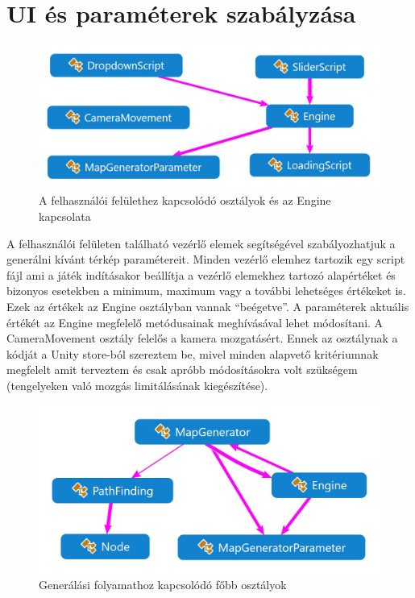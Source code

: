 \newpage
\section{UI és paraméterek szabályzása}

\begin{figure}[h!]
\centering
\includegraphics[scale=0.37]{kepek/White_UI.JPG}
\caption{A felhasználói felülethez kapcsolódó osztályok és az Engine kapcsolata}
\label{fig:UI}
\end{figure}

\noindent A felhasználói felületen található vezérlő elemek segítségével szabályozhatjuk a generálni kívánt térkép paramétereit. Minden vezérlő elemhez tartozik egy script fájl ami a játék indításakor beállítja a vezérlő elemekhez tartozó alapértéket és bizonyos esetekben a minimum, maximum vagy a további lehetséges értékeket is. Ezek az értékek az Engine osztályban vannak “beégetve”. A paraméterek aktuális értékét az Engine megfelelő metódusainak meghívásával lehet módosítani.
\newline
\newline A CameraMovement osztály felelős a kamera mozgatásért. Ennek az osztálynak a kódját a Unity store-ból szereztem be, mivel minden alapvető kritériumnak megfelelt amit terveztem és csak apróbb módosításokra volt szükségem (tengelyeken való mozgás limitálásának kiegészítése). 

\begin{figure}[h!]
\centering
\includegraphics[scale=0.4]{kepek/White_Generalas.JPG}
\caption{Generálási folyamathoz kapcsolódó főbb osztályok}
\label{fig:generalas}
\end{figure}

